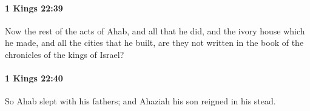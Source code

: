 		\paragraph{1 Kings 22:39} %
			\label{1KINGS-22-39}

			Now the rest of the acts of Ahab, and all that he did, and the ivory house which he made, and all the cities that he built, are they not written in the book of the chronicles of the kings of Israel?


		\paragraph{1 Kings 22:40} %
			\label{1KINGS-22-40}

			So Ahab slept with his fathers; and Ahaziah his son reigned in his stead.



